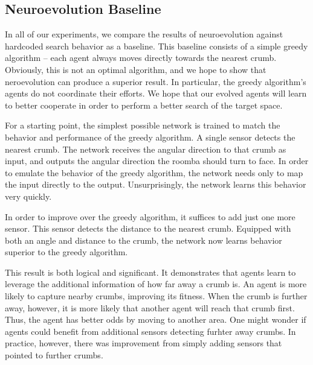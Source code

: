 \documentclass[conference]{IEEEtran}
\begin{document}


\subsection{Neuroevolution Baseline}

In all of our experiments, we compare the results of neuroevolution against hardcoded search behavior as a baseline. This baseline consists of a simple greedy algorithm -- each agent always moves directly towards the nearest crumb. Obviously, this is not an optimal algorithm, and we hope to show that neroevolution can produce a superior result. In particular, the greedy algorithm's agents do not coordinate their efforts. We hope that our evolved agents will learn to better cooperate in order to perform a better search of the target space.

For a starting point, the simplest possible network is trained to match the behavior and performance of the greedy algorithm. A single sensor detects the nearest crumb. The network receives the angular direction to that crumb as input, and outputs the angular direction the roomba should turn to face. In order to emulate the behavior of the greedy algorithm, the network needs only to map the input directly to the output. Unsurprisingly, the network learns this behavior very quickly.

In order to improve over the greedy algorithm, it suffices to add just one more sensor. This sensor detects the distance to the nearest crumb. Equipped with both an angle and distance to the crumb, the network now learns behavior superior to the greedy algorithm.

This result is both logical and significant. It demonstrates that agents learn to leverage the additional information of how far away a crumb is. An agent is more likely to capture nearby crumbs, improving its fitness. When the crumb is further away, however, it is more likely that another agent will reach that crumb first. Thus, the agent has better odds by moving to another area. 
One might wonder if agents could benefit from additional sensors detecting furhter away crumbs. In practice, however, there was improvement from simply adding sensors that pointed to further crumbs.
\end{document}

